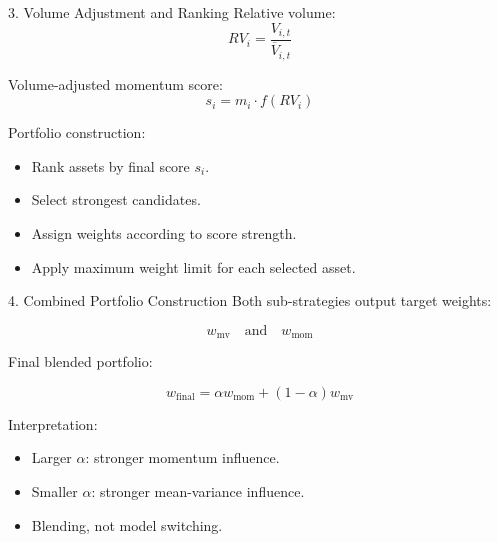 \documentclass[aspectratio=169]{beamer}
\begin{document}
\begin{frame}{3. Volume Adjustment and Ranking}
  Relative volume:
  \[
    RV_i
    =
    \frac{V_{i,t}}{\overline{V}_{i,t}}
  \]

  Volume-adjusted momentum score:
  \[
    s_i
    =
    m_i \cdot f(RV_i)
  \]

  \vspace{0.3cm}

  Portfolio construction:
  \begin{itemize}
    \item Rank assets by final score $s_i$.
    \item Select strongest candidates.
    \item Assign weights according to score strength.
    \item Apply maximum weight limit for each selected asset.
  \end{itemize}
\end{frame}

\begin{frame}{4. Combined Portfolio Construction}
  Both sub-strategies output target weights:

  \[
    w_{\text{mv}}
    \quad \text{and} \quad
    w_{\text{mom}}
  \]

  Final blended portfolio:

  \[
    w_{\text{final}}
    =
    \alpha w_{\text{mom}}
    +
    (1-\alpha)w_{\text{mv}}
  \]

  \vspace{0.3cm}

  Interpretation:
  \begin{itemize}
    \item Larger $\alpha$: stronger momentum influence.
    \item Smaller $\alpha$: stronger mean-variance influence.
    \item Blending, not model switching.
  \end{itemize}
\end{frame}
\end{document}
